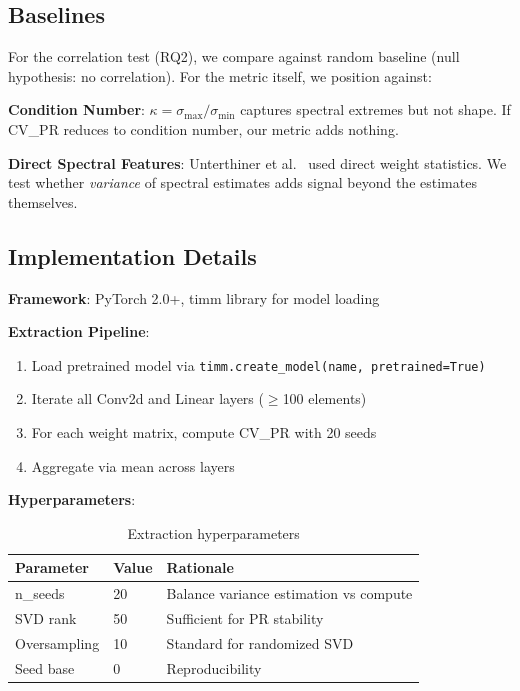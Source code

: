 \subsection{Baselines}

For the correlation test (RQ2), we compare against random baseline (null hypothesis: no correlation). For the metric itself, we position against:

\textbf{Condition Number}: $\kappa = \sigma_\text{max} / \sigma_\text{min}$ captures spectral extremes but not shape. If CV\_PR reduces to condition number, our metric adds nothing.

\textbf{Direct Spectral Features}: Unterthiner et al.~\cite{unterthiner2020predicting} used direct weight statistics. We test whether \emph{variance} of spectral estimates adds signal beyond the estimates themselves.

\subsection{Implementation Details}

\textbf{Framework}: PyTorch 2.0+, timm library for model loading

\textbf{Extraction Pipeline}:
\begin{enumerate}
    \item Load pretrained model via \texttt{timm.create\_model(name, pretrained=True)}
    \item Iterate all Conv2d and Linear layers ($\geq$100 elements)
    \item For each weight matrix, compute CV\_PR with 20 seeds
    \item Aggregate via mean across layers
\end{enumerate}

\textbf{Hyperparameters}:

\begin{table}[h]
\centering
\caption{Extraction hyperparameters}
\label{tab:hyperparams}
\begin{tabular}{lll}
\toprule
Parameter & Value & Rationale \\
\midrule
n\_seeds & 20 & Balance variance estimation vs compute \\
SVD rank & 50 & Sufficient for PR stability \\
Oversampling & 10 & Standard for randomized SVD \\
Seed base & 0 & Reproducibility \\
\bottomrule
\end{tabular}
\end{table}

